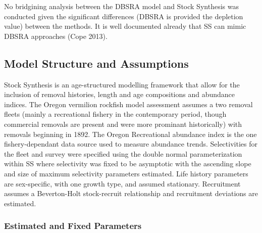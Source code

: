 \documentclass[11pt,
  english,
  a4paper,
]{article}
\begin{document}
\leavevmode\tagmcend\tagstructend


No bridgining analysis between the DBSRA model and Stock Synthesis was conducted given the significant differences (DBSRA is provided the depletion value) between the methods. It is well documented already that SS can mimic DBSRA approaches {(Cope 2013)\leavevmode\tagmcend\tagstructend}.

\leavevmode\tagmcend\tagstructend\par


\hypertarget{model-structure-and-assumptions}{%
\subsection{Model Structure and Assumptions}\label{model-structure-and-assumptions}}

\leavevmode\tagmcend\tagstructend


Stock Synthesis is an age-structured modelling framework that allow for the inclusion of removal histories, length and age compositions and abundance indices. The Oregon vermilion rockfish model assessment assumes a two removal fleets (mainly a recreational fishery in the contemporary period, though commercial removals are present and were more prominant historically) with removals beginning in 1892. The Oregon Recreational abundance index is the one fishery-dependant data source used to measure abundance trends. Selectivities for the fleet and survey were specified using the double normal parameterization within SS where selectivity was fixed to be asymptotic with the ascending slope and size of maximum selectivity parameters estimated. Life history parameters are sex-specific, with one growth type, and assumed stationary. Recruitment assumes a Beverton-Holt stock-recruit relationship and recruitment deviations are estimated.

\leavevmode\tagmcend\tagstructend\par


\hypertarget{estimated-and-fixed-parameters}{%
\subsubsection{Estimated and Fixed Parameters}\label{estimated-and-fixed-parameters}}
\end{document}

